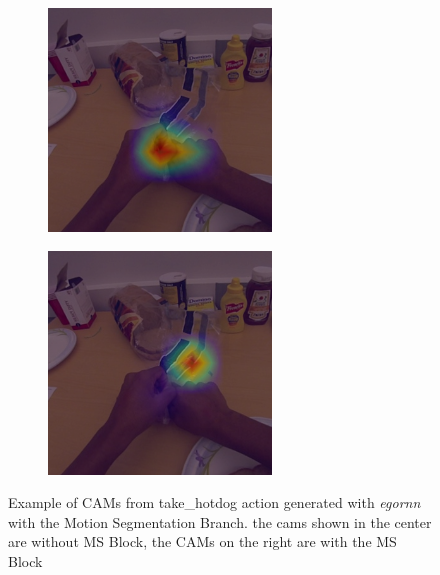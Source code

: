 \documentclass[10pt,twocolumn,hidelinks,letterpaper]{article}
\begin{document}
\begin{figure}[t]
\begin{subfigure}{.32\linewidth}
  \end{subfigure}
  \begin{subfigure}{.32\linewidth}
  	\includegraphics[width=\linewidth]{images/Cams2/S2-take_hotdog/rgb0076_CAM.png}
  \end{subfigure}
  \begin{subfigure}{.32\linewidth}
  	\includegraphics[width=\linewidth]{images/Cams2/S2-take_hotdog/rgb0076_CAM_MS.png}
  \end{subfigure}
  \caption{Example of CAMs from take\_hotdog action generated with \textit{egornn} with the Motion Segmentation Branch. the cams shown in the center are without MS Block, the CAMs on the right are with the MS Block}
  \label{cam2_2}
\end{figure}
\end{document}
